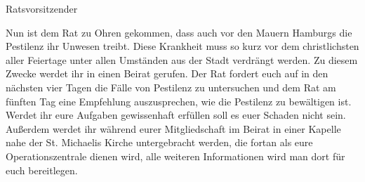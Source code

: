 \begin{say-box}{Ratsvorsitzender}

Nun ist dem Rat zu Ohren gekommen, dass auch vor den Mauern Hamburgs die Pestilenz
ihr Unwesen treibt. Diese Krankheit muss so kurz vor dem christlichsten aller
Feiertage unter allen Umständen aus der Stadt verdrängt werden. Zu diesem Zwecke
werdet ihr in einen Beirat gerufen. Der Rat fordert euch auf in den nächsten vier
Tagen die Fälle von Pestilenz zu untersuchen und dem Rat am fünften Tag eine
Empfehlung auszusprechen, wie die Pestilenz zu bewältigen ist. Werdet ihr eure
Aufgaben gewissenhaft erfüllen soll es euer Schaden nicht sein.
Außerdem werdet ihr während eurer Mitgliedschaft im Beirat in einer Kapelle nahe
der St. Michaelis Kirche untergebracht werden, die fortan als eure
Operationszentrale dienen wird, alle weiteren Informationen wird man dort für
euch bereitlegen.

\end{say-box}
